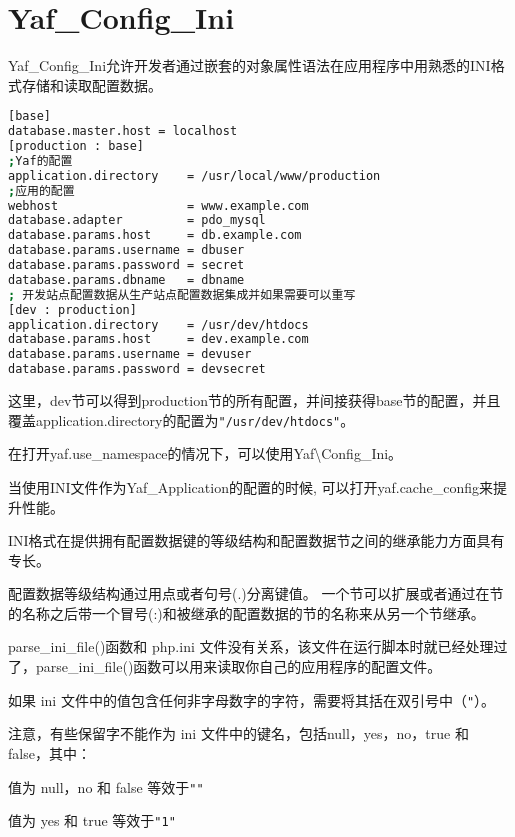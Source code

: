 \chapter{Yaf\_Config\_Ini}



Yaf\_Config\_Ini允许开发者通过嵌套的对象属性语法在应用程序中用熟悉的INI格式存储和读取配置数据。 



\begin{lstlisting}[language=bash]
[base]
database.master.host = localhost
[production : base]
;Yaf的配置
application.directory    = /usr/local/www/production
;应用的配置
webhost                  = www.example.com
database.adapter         = pdo_mysql
database.params.host     = db.example.com
database.params.username = dbuser
database.params.password = secret
database.params.dbname   = dbname
; 开发站点配置数据从生产站点配置数据集成并如果需要可以重写
[dev : production]
application.directory    = /usr/dev/htdocs
database.params.host     = dev.example.com
database.params.username = devuser
database.params.password = devsecret
\end{lstlisting}

这里，dev节可以得到production节的所有配置，并间接获得base节的配置，并且覆盖application.directory的配置为\texttt{"/usr/dev/htdocs"}。

在打开yaf.use\_namespace的情况下，可以使用Yaf\textbackslash Config\_Ini。

当使用INI文件作为Yaf\_Application的配置的时候, 可以打开yaf.cache\_config来提升性能。




INI格式在提供拥有配置数据键的等级结构和配置数据节之间的继承能力方面具有专长。

配置数据等级结构通过用点或者句号(.)分离键值。 一个节可以扩展或者通过在节的名称之后带一个冒号(:)和被继承的配置数据的节的名称来从另一个节继承。

parse\_ini\_file()函数和 php.ini 文件没有关系，该文件在运行脚本时就已经处理过了，parse\_ini\_file()函数可以用来读取你自己的应用程序的配置文件。

如果 ini 文件中的值包含任何非字母数字的字符，需要将其括在双引号中（\texttt{"}）。

注意，有些保留字不能作为 ini 文件中的键名，包括null，yes，no，true 和 false，其中：

\begin{compactitem}
\item 值为 null，no 和 false 等效于\texttt{""}
\item 值为 yes 和 true 等效于\texttt{"1"}
\end{compactitem}

